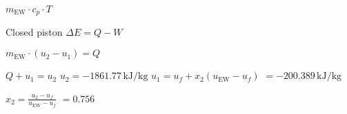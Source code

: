 \( m_{\text{EW}} \cdot c_p \cdot T \)  

Closed piston  
\( \Delta E = Q - W \)  

\( m_{\text{EW}} \cdot (u_2 - u_1) = Q \)  

\( Q + u_1 = u_2 \)  
\( u_2 = -1861.77 \, \text{kJ/kg} \)  
\( u_1 = u_f + x_2 (u_{\text{EW}} - u_f) \)  
\( = -200.389 \, \text{kJ/kg} \)  

\( x_2 = \frac{u_2 - u_f}{u_{\text{EW}} - u_f} \)  
\( = 0.756 \)
